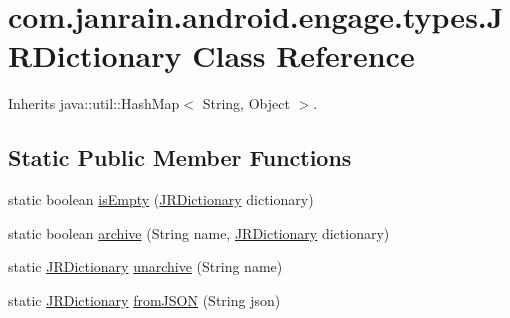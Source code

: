 \hypertarget{classcom_1_1janrain_1_1android_1_1engage_1_1types_1_1_j_r_dictionary}{
\section{com.janrain.android.engage.types.JRDictionary Class Reference}
\label{classcom_1_1janrain_1_1android_1_1engage_1_1types_1_1_j_r_dictionary}
}


Inherits java::util::HashMap$<$ String, Object $>$.

\subsection*{Static Public Member Functions}
\begin{DoxyCompactItemize}
\item 
static boolean \hyperlink{classcom_1_1janrain_1_1android_1_1engage_1_1types_1_1_j_r_dictionary_a6a288e9d965beb7a74fc149d0050ae03}{isEmpty} (\hyperlink{classcom_1_1janrain_1_1android_1_1engage_1_1types_1_1_j_r_dictionary}{JRDictionary} dictionary)
\item 
static boolean \hyperlink{classcom_1_1janrain_1_1android_1_1engage_1_1types_1_1_j_r_dictionary_a4c9c410ecc79cf9887cd970a6ae2d091}{archive} (String name, \hyperlink{classcom_1_1janrain_1_1android_1_1engage_1_1types_1_1_j_r_dictionary}{JRDictionary} dictionary)
\item 
static \hyperlink{classcom_1_1janrain_1_1android_1_1engage_1_1types_1_1_j_r_dictionary}{JRDictionary} \hyperlink{classcom_1_1janrain_1_1android_1_1engage_1_1types_1_1_j_r_dictionary_ab70d63b87ff8a7d8859ee7d2b1b9077f}{unarchive} (String name)
\item 
static \hyperlink{classcom_1_1janrain_1_1android_1_1engage_1_1types_1_1_j_r_dictionary}{JRDictionary} \hyperlink{classcom_1_1janrain_1_1android_1_1engage_1_1types_1_1_j_r_dictionary_ae3c7c58b10a32f16ad79eee95ac14a38}{fromJSON} (String json)
\end{DoxyCompactItemize}
